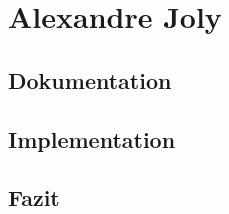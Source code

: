 \section{Alexandre Joly}

\subsection*{Dokumentation}

\subsection*{Implementation}

\subsection*{Fazit}